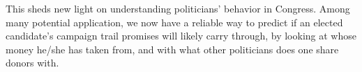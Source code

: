 \documentclass[12pt,twocolumn]{article}
\begin{document}
This sheds new light on understanding politicians' behavior in Congress. Among many potential application, we now have a reliable way to predict if an elected candidate's campaign trail promises will likely carry through, by looking at whose money he/she has taken from, and with what other politicians does one share donors with. 




\end{document}
